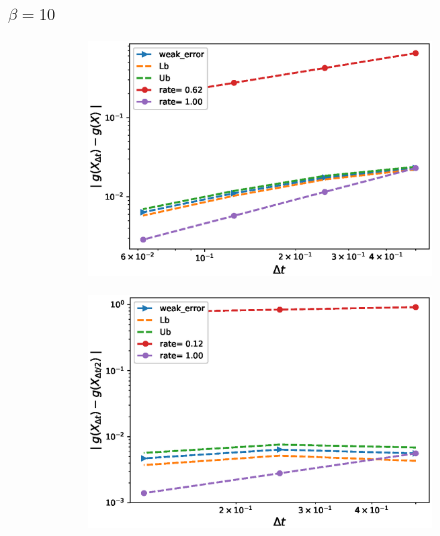 \documentclass[11pt]{article}
\begin{document}
\subsubsection*{$\beta=10$}

\begin{figure}[h!]
	\centering
	\begin{subfigure}{.4\textwidth}
		\centering
		\includegraphics[width=1\linewidth]{./figures/weak_error_rates_call/Beta_10/without_richardson/weak_convergence_order_call_option_relative_M_10_5}
		\caption{}
		\label{fig:sub3}
	\end{subfigure}%
	\begin{subfigure}{.4\textwidth}
		\centering
		\includegraphics[width=1\linewidth]{./figures/weak_error_rates_call/Beta_10/without_richardson/weak_convergence_order_differences_call_option_relative_M_10_5}
		\caption{}
		\label{fig:sub4}
	\end{subfigure}
	

\end{figure}
\end{document}
